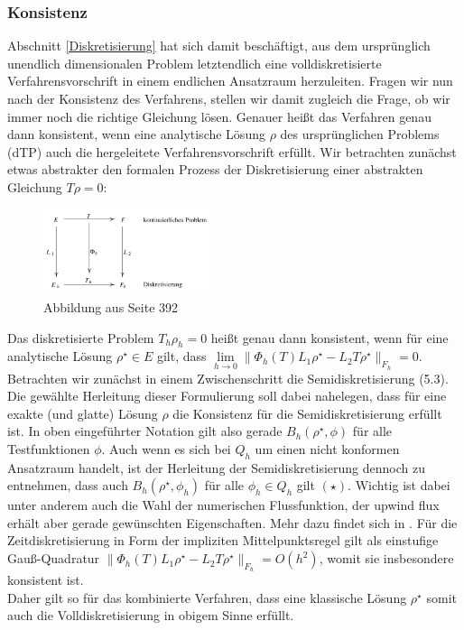 \subsubsection{Konsistenz}
	 Abschnitt \ref{Diskretisierung} hat sich damit beschäftigt, aus dem ursprünglich unendlich dimensionalen Problem letztendlich eine volldiskretisierte Verfahrensvorschrift in einem endlichen Ansatzraum herzuleiten. Fragen wir nun nach der Konsistenz des Verfahrens, stellen wir damit zugleich die Frage, ob wir immer noch die richtige Gleichung lösen. Genauer heißt das Verfahren genau dann konsistent, wenn eine analytische Lösung $ \rho $ des ursprünglichen Problems (dTP) auch die hergeleitete Verfahrensvorschrift erfüllt. 
	 Wir betrachten zunächst etwas abstrakter den formalen Prozess der Diskretisierung einer abstrakten Gleichung $ T \rho=0 $:
	 \begin{figure}[H]
	 	\centering
	 	\includegraphics[width=0.45\textwidth]{abstraktkonsistenz.png} \\
	 	Abbildung aus \cite{brokate2016grundwissen} Seite 392
	 \end{figure}
	 Das diskretisierte Problem $ T_h \rho_h = 0  $ heißt genau dann konsistent, wenn für eine analytische Lösung $ \rho^{\star} \in E $ gilt, dass $ \lim\limits_{h \to 0}\lVert \Phi_h(T)L_1\rho^{\star} - L_2T\rho^{\star} \rVert_{F_h} = 0 $.
	 Betrachten wir zunächst in einem Zwischenschritt die Semidiskretisierung (5.3).
	 Die gewählte Herleitung dieser Formulierung soll dabei nahelegen, dass für eine exakte (und glatte) Lösung $ \rho $ die Konsistenz für die Semidiskretisierung erfüllt ist. In oben eingeführter Notation gilt also gerade $ B_h(\rho^{\star},\phi) $ für alle Testfunktionen $ \phi $. Auch wenn es sich bei $ Q_h $ um einen nicht konformen Ansatzraum handelt, ist der Herleitung der Semidiskretisierung dennoch zu entnehmen, dass auch $ B_h(\rho^{\star},\phi_h) $ für alle $ \phi_h \in Q_h $ gilt $(\star)$.  Wichtig ist dabei unter anderem auch die Wahl der numerischen Flussfunktion, der upwind flux erhält aber gerade gewünschten Eigenschaften. 
	 Mehr dazu findet sich in \cite{Har08b}.
	 Für die Zeitdiskretisierung in Form der impliziten Mittelpunktsregel gilt als einstufige Gauß-Quadratur $ \lVert \Phi_h(T)L_1\rho^{\star} - L_2T\rho^{\star} \rVert_{F_h} = O(h^2)$, womit sie insbesondere konsistent ist. \\
	 Daher gilt so für das kombinierte Verfahren, dass eine klassische Lösung $ \rho^{\star} $ somit auch die Volldiskretisierung in obigem Sinne erfüllt. 

